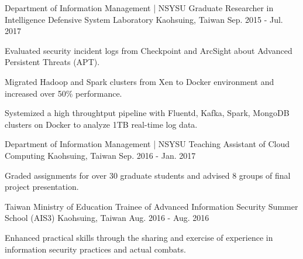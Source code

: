 


\begin{cventries}


\cventry
{Department of Information Management | NSYSU} %
{Graduate Researcher in Intelligence Defensive System Laboratory} %
{Kaohsuing, Taiwan} %
{Sep. 2015 - Jul. 2017} %
{ %
\begin{cvitems}
\item {Evaluated security incident logs from Checkpoint and ArcSight about Advanced Persistent Threats (APT).}
\item {Migrated Hadoop and Spark clusters from Xen to Docker environment and increased over 50\% performance.}
\item {Systemized a high throughtput pipeline with Fluentd, Kafka, Spark, MongoDB clusters on Docker to analyze 1TB real-time log data.}
\end{cvitems}
}


\cventry
{Department of Information Management | NSYSU} %
{Teaching Assistant of Cloud Computing} %
{Kaohsuing, Taiwan} %
{Sep. 2016 - Jan. 2017} %
{ %
\begin{cvitems}
\item {Graded assignments for over 30 graduate students and advised 8 groups of final project presentation.}
\end{cvitems}
}


\cventry
{Taiwan Ministry of Education} %
{Trainee of Advanced Information Security Summer School (AIS3)} %
{Kaohsuing, Taiwan} %
{Aug. 2016 - Aug. 2016} %
{ %
\begin{cvitems}
\item {Enhanced practical skills through the sharing and exercise of experience in information security practices and actual combats.}
\end{cvitems}
}


\end{cventries}
